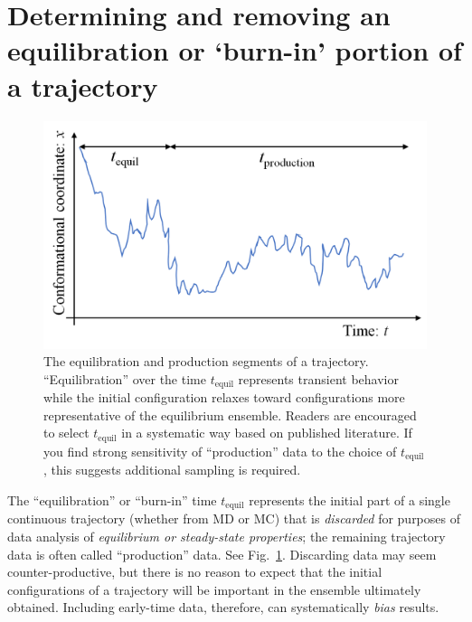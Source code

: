 
\section{Determining and removing an equilibration or `burn-in' portion of a trajectory}
\label{sec:equil}

\begin{figure}
  \centering
  \includegraphics[width=0.9\linewidth]{figures/tequil-time-trace}
  \caption{
  \label{fig:tequil}
  The equilibration and production segments of a trajectory.
  ``Equilibration'' over the time $t_{\mathrm{equil}}$ represents transient behavior while the initial configuration relaxes toward configurations more representative of the equilibrium ensemble.
  Readers are encouraged to select $t_{\mathrm{equil}}$ in a systematic way based on published literature.
  If you find strong sensitivity of ``production'' data to the choice of $t_{\mathrm{equil}}$, this suggests additional sampling is required.
  }
\end{figure}

The ``equilibration'' or ``burn-in'' time $t_{\mathrm{equil}}$ represents the initial part of a single continuous trajectory (whether from MD or MC) that is \emph{discarded} for purposes of data analysis of \emph{equilibrium or steady-state properties};
the remaining trajectory data is often called ``production'' data.
See Fig.\ \ref{fig:tequil}.
Discarding data may seem counter-productive, but there is no reason to expect that the initial configurations of a trajectory will be important in the ensemble ultimately obtained.
Including early-time data, therefore, can systematically \emph{bias} results.


